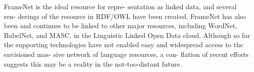 FrameNet is the ideal resource for repre- sentation as linked data, and several ren- derings of the resource in RDF/OWL have been created. FrameNet has also been and continues to be linked to other major resources, including WordNet, BabelNet, and MASC, in the Linguistic Linked Open Data cloud. Although so far the supporting technologies have not enabled easy and widespread access to the envisioned mas- sive network of language resources, a con- flation of recent efforts suggests this may be a reality in the not-too-distant future.
